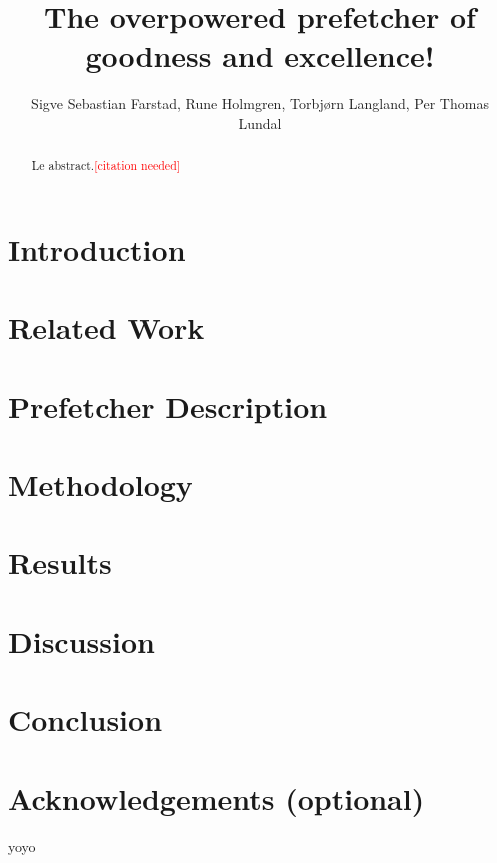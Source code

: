 \documentclass[a4paper]{IEEEtran}
\title{The overpowered prefetcher of goodness and excellence!}
\author{
    Sigve Sebastian Farstad,
    Rune Holmgren,
    Torbjørn Langland,
    Per Thomas Lundal
}
\newcommand\cn{\textcolor{red}{[citation needed]}}
\begin{document}
\maketitle

\begin{abstract}
    Le abstract.\cn
\end{abstract}

\section{Introduction}
\section{Related Work}
\section{Prefetcher Description}
\section{Methodology}
\section{Results}
\section{Discussion}
\section{Conclusion}
\section{Acknowledgements (optional)}

yoyo \cite{assignment-text}



\nocite{*}
\end{document}
